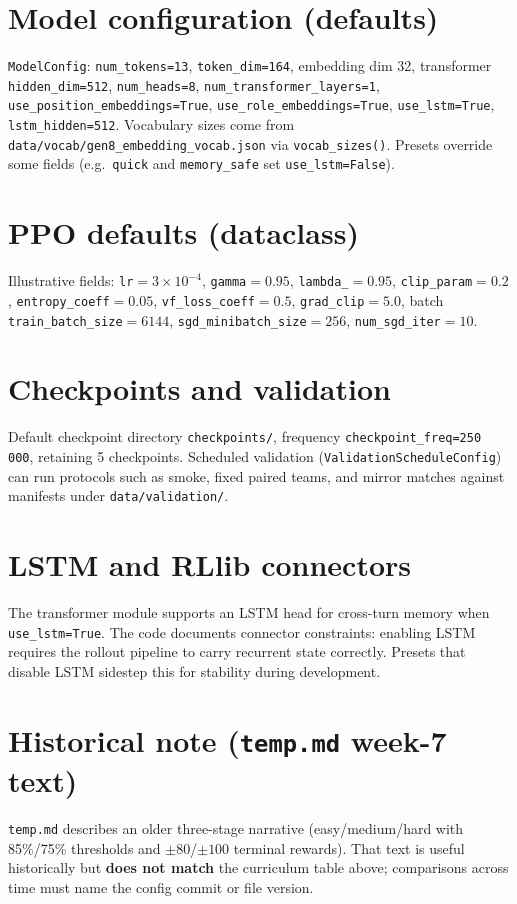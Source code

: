\section{Model configuration (defaults)}
\texttt{ModelConfig}: \texttt{num\_tokens=13}, \texttt{token\_dim=164}, embedding dim 32, transformer \texttt{hidden\_dim=512}, \texttt{num\_heads=8}, \texttt{num\_transformer\_layers=1}, \texttt{use\_position\_embeddings=True}, \texttt{use\_role\_embeddings=True}, \texttt{use\_lstm=True}, \texttt{lstm\_hidden=512}. Vocabulary sizes come from \texttt{data/vocab/gen8\_embedding\_vocab.json} via \texttt{vocab\_sizes()}. Presets override some fields (e.g.\ \texttt{quick} and \texttt{memory\_safe} set \texttt{use\_lstm=False}).

\section{PPO defaults (dataclass)}
Illustrative fields: \texttt{lr}$=3\times10^{-4}$, \texttt{gamma}$=0.95$, \texttt{lambda\_}$=0.95$, \texttt{clip\_param}$=0.2$, \texttt{entropy\_coeff}$=0.05$, \texttt{vf\_loss\_coeff}$=0.5$, \texttt{grad\_clip}$=5.0$, batch \texttt{train\_batch\_size}$=6144$, \texttt{sgd\_minibatch\_size}$=256$, \texttt{num\_sgd\_iter}$=10$.

\section{Checkpoints and validation}
Default checkpoint directory \texttt{checkpoints/}, frequency \texttt{checkpoint\_freq=250\,000}, retaining 5 checkpoints. Scheduled validation (\texttt{ValidationScheduleConfig}) can run protocols such as smoke, fixed paired teams, and mirror matches against manifests under \texttt{data/validation/}.

\section{LSTM and RLlib connectors}
The transformer module supports an LSTM head for cross-turn memory when \texttt{use\_lstm=True}. The code documents connector constraints: enabling LSTM requires the rollout pipeline to carry recurrent state correctly. Presets that disable LSTM sidestep this for stability during development.

\section{Historical note (\texttt{temp.md} week-7 text)}
\texttt{temp.md} describes an older three-stage narrative (easy/medium/hard with 85\%/75\% thresholds and $\pm80$/$\pm100$ terminal rewards). That text is useful historically but \textbf{does not match} the curriculum table above; comparisons across time must name the config commit or file version.
